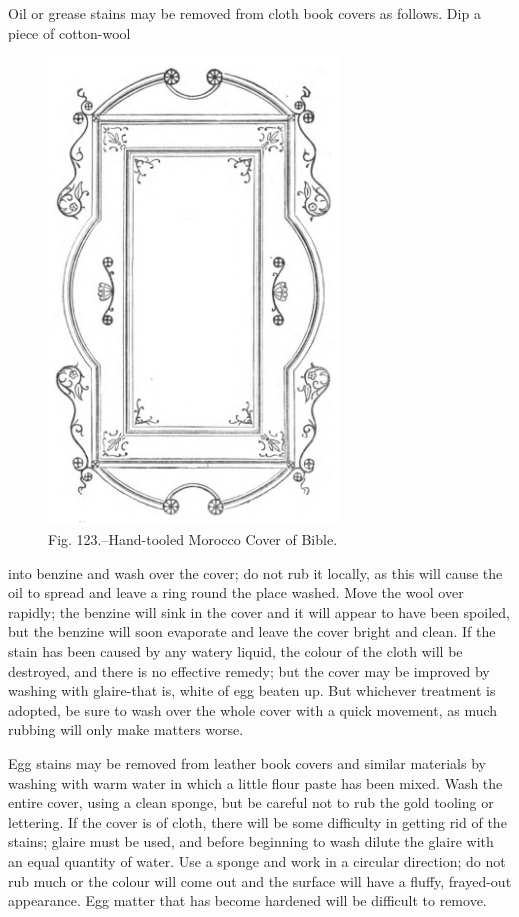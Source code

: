 \documentclass[twoside]{book}
\begin{document}
Oil or grease stains may be removed from cloth
book covers as follows. Dip a piece of cotton-wool
\pagebreak
	\vspace*{\fill}
	\begin{figure}[h]
		\centering
		\includegraphics[width=0.69\textwidth]{Figures/_123.png}
		\caption*{Fig. 123.--Hand-tooled Morocco Cover of Bible.}
	\end{figure}
	\vspace*{\fill}
into benzine and wash over the cover; do not rub
it locally, as this will cause the oil to spread and
\pagebreak
leave a ring round the place washed. Move the
wool over rapidly; the benzine will sink in the
cover and it will appear to have been spoiled, but
the benzine will soon evaporate and leave the cover
bright and clean. If the stain has been caused by
any watery liquid, the colour of the cloth will be
destroyed, and there is no effective remedy; but the
cover may be improved by washing with glaire-that
is, white of egg beaten up. But whichever treatment
is adopted, be sure to wash over the whole cover
with a quick movement, as much rubbing will only
make matters worse.

Egg stains may be removed from leather book
covers and similar materials by washing with warm
water in which a little flour paste has been mixed.
Wash the entire cover, using a clean sponge, but be
careful not to rub the gold tooling or lettering. If
the cover is of cloth, there will be some difficulty in
getting rid of the stains; glaire must be used, and
before beginning to wash dilute the glaire with an
equal quantity of water. Use a sponge and work in
a circular direction; do not rub much or the colour
will come out and the surface will have a fluffy,
frayed-out appearance. Egg matter that has become
hardened will be difficult to remove.
\end{document}
